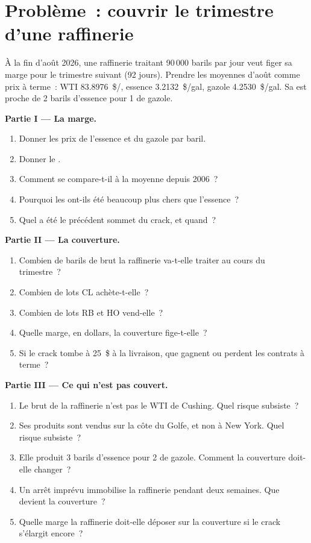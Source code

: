 \section{Problème~: couvrir le trimestre d'une raffinerie}

\begin{problem}\label{pb:m3:refined-products-and-cracks:1}
À la fin d'août 2026, une raffinerie traitant 90\,000 barils par jour veut
figer sa marge pour le trimestre suivant (92 jours). Prendre les moyennes d'août comme
prix à terme~: WTI \qty{83.8976}{\$/\barrel}, essence \qty{3.2132}{\$/gal}, gazole
\qty{4.2530}{\$/gal}. Sa  est proche de 2 barils d'essence pour 1 de gazole.

\medskip\noindent\textbf{Partie I --- La marge.}
\begin{enumerate}
\item Donner les prix de l'essence et du gazole par baril.
\item Donner le .
\item Comment se compare-t-il à la moyenne depuis 2006~?
\item Pourquoi les  ont-ils été beaucoup plus chers que l'essence~?
\item Quel a été le précédent sommet du crack, et quand~?
\end{enumerate}

\medskip\noindent\textbf{Partie II --- La couverture.}
\begin{enumerate}[resume]
\item Combien de barils de brut la raffinerie va-t-elle traiter au cours du trimestre~?
\item Combien de lots CL achète-t-elle~?
\item Combien de lots RB et HO vend-elle~?
\item Quelle marge, en dollars, la couverture fige-t-elle~?
\item Si le crack tombe à 25~\$ à la livraison, que gagnent ou perdent les contrats à terme~?
\end{enumerate}

\medskip\noindent\textbf{Partie III --- Ce qui n'est pas couvert.}
\begin{enumerate}[resume]
\item Le brut de la raffinerie n'est pas le WTI de Cushing. Quel risque subsiste~?
\item Ses produits sont vendus sur la côte du Golfe, et non à New York. Quel risque subsiste~?
\item Elle produit 3 barils d'essence pour 2 de gazole. Comment la couverture doit-elle changer~?
\item Un arrêt imprévu immobilise la raffinerie pendant deux semaines. Que devient la couverture~?
\item Quelle marge la raffinerie doit-elle déposer sur la couverture si le crack s'élargit encore~?
\end{enumerate}


\end{problem}
